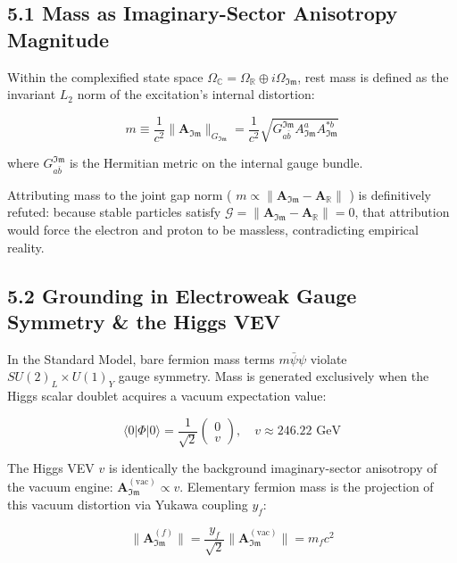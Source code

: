\documentclass[11pt,a4paper]{article}
\theoremstyle{definition}\newtheorem{definition}{Definition}
\theoremstyle{remark}\newtheorem{remark}{Remark}
\begin{document}
\subsection{5.1 Mass as Imaginary-Sector Anisotropy Magnitude}

Within the complexified state space $\Omega_{\mathbb{C}} = \Omega_{\mathbb{R}} \oplus i \Omega_{\mathfrak{Im}}$, rest mass is defined as the invariant $L_2$ norm of the excitation's internal distortion:


\begin{equation}
m \equiv \frac{1}{c^2} \|\mathbf{A}_{\mathfrak{Im}}\|_{G_{\mathfrak{Im}}} = \frac{1}{c^2} \sqrt{G_{a\bar{b}}^{\mathfrak{Im}} A_{\mathfrak{Im}}^a A_{\mathfrak{Im}}^{*b}}
\end{equation}


where $G_{a\bar{b}}^{\mathfrak{Im}}$ is the Hermitian metric on the internal gauge bundle.

Attributing mass to the joint gap norm ( $m \propto \|\mathbf{A}_{\mathfrak{Im}} - \mathbf{A}_{\mathbb{R}}\|$ ) is definitively refuted: because stable particles satisfy $\mathcal{G} = \|\mathbf{A}_{\mathfrak{Im}} - \mathbf{A}_{\mathbb{R}}\| = 0$, that attribution would force the electron and proton to be massless, contradicting empirical reality.
\subsection{5.2 Grounding in Electroweak Gauge Symmetry \& the Higgs VEV}

In the Standard Model, bare fermion mass terms $m\bar{\psi}\psi$ violate $SU(2)_L \times U(1)_Y$ gauge symmetry. Mass is generated exclusively when the Higgs scalar doublet acquires a vacuum expectation value:


\begin{equation}
\langle 0 | \Phi | 0 \rangle = \frac{1}{\sqrt{2}} \begin{pmatrix} 0 \\ v \end{pmatrix}, \quad v \approx 246.22\text{ GeV}
\end{equation}


The Higgs VEV $v$ is identically the background imaginary-sector anisotropy of the vacuum engine: $\mathbf{A}_{\mathfrak{Im}}^{(\text{vac})} \propto v$. Elementary fermion mass is the projection of this vacuum distortion via Yukawa coupling $y_f$:


\begin{equation}
\|\mathbf{A}_{\mathfrak{Im}}^{(f)}\| = \frac{y_f}{\sqrt{2}} \|\mathbf{A}_{\mathfrak{Im}}^{(\text{vac})}\| = m_f c^2
\end{equation}
\end{document}
